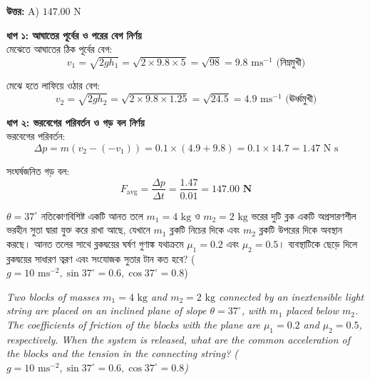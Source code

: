 \documentclass[12pt, a4paper]{article}
\begin{document}
{\begin{tcolorbox}[answerbox]
\textbf{\color{success} উত্তর:} A) $147.00\text{ N}$
\end{tcolorbox}
\vspace{1em}

\begin{tcolorbox}[solutionbox={সমাধান (Solution)}]
\noindent
\textbf{ধাপ ১: আঘাতের পূর্বের ও পরের বেগ নির্ণয়} \\
মেঝেতে আঘাতের ঠিক পূর্বের বেগ:
\[v_1 = \sqrt{2gh_1} = \sqrt{2 \times 9.8 \times 5} = \sqrt{98} = 9.8\text{ ms}^{-1}\text{ (নিম্নমুখী)}\]

মেঝে হতে লাফিয়ে ওঠার বেগ:
\[v_2 = \sqrt{2gh_2} = \sqrt{2 \times 9.8 \times 1.25} = \sqrt{24.5} = 4.9\text{ ms}^{-1}\text{ (ঊর্ধ্বমুখী)}\]

\vspace{0.5em}
\noindent\textbf{ধাপ ২: ভরবেগের পরিবর্তন ও গড় বল নির্ণয়} \\
ভরবেগের পরিবর্তন:
\[\Delta p = m(v_2 - (-v_1)) = 0.1 \times (4.9 + 9.8) = 0.1 \times 14.7 = 1.47\text{ N s}\]

সংঘর্ষজনিত গড় বল:
\[F_{\text{avg}} = \frac{\Delta p}{\Delta t} = \frac{1.47}{0.01} = \mathbf{147.00\text{ N}}\]
\end{tcolorbox}
\begin{tcolorbox}[questionbox={প্রশ্ন (Question) 42}]
\noindent
$\theta = 37^\circ$ নতিকোণবিশিষ্ট একটি আনত তলে $m_1 = 4\text{ kg}$ ও $m_2 = 2\text{ kg}$ ভরের দুটি ব্লক একটি অপ্রসারণশীল ভরহীন সুতা দ্বারা যুক্ত করে রাখা আছে, যেখানে $m_1$ ব্লকটি নিচের দিকে এবং $m_2$ ব্লকটি উপরের দিকে অবস্থান করছে। আনত তলের সাথে ব্লকদ্বয়ের ঘর্ষণ গুণাঙ্ক যথাক্রমে $\mu_1 = 0.2$ এবং $\mu_2 = 0.5$। ব্যবস্থাটিকে ছেড়ে দিলে ব্লকদ্বয়ের সাধারণ ত্বরণ এবং সংযোজক সুতার টান কত হবে? ($g = 10\text{ ms}^{-2}, \sin 37^\circ = 0.6, \cos 37^\circ = 0.8$)

\vspace{0.8em}
\begin{english}
\noindent\textit{\color{darkgray}
Two blocks of masses $m_1 = 4\text{ kg}$ and $m_2 = 2\text{ kg}$ connected by an inextensible light string are placed on an inclined plane of slope $\theta = 37^\circ$, with $m_1$ placed below $m_2$. The coefficients of friction of the blocks with the plane are $\mu_1 = 0.2$ and $\mu_2 = 0.5$, respectively. When the system is released, what are the common acceleration of the blocks and the tension in the connecting string? ($g = 10\text{ ms}^{-2}, \sin 37^\circ = 0.6, \cos 37^\circ = 0.8$)
}
\end{english}
\end{tcolorbox}

}
\end{document}
